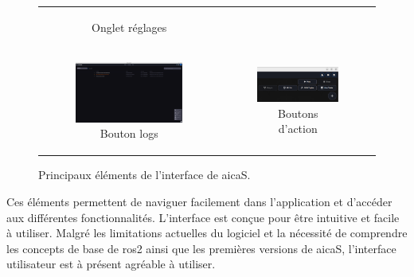 \begin{figure}[H]
\begin{tabular}{cc}
\begin{subfigure}{0.45\textwidth}
            \caption{Onglet réglages}
            \label{fig:aica_rviz}
        \end{subfigure}        \\
        \addlinespace[0.5em]
        \begin{subfigure}{0.45\textwidth}
            \centering
            \includegraphics[width=0.9\linewidth]{assets/figures/AICA_logs.png}
            \caption{Bouton logs}
            \label{fig:aica_logs}
        \end{subfigure}        &
        \begin{subfigure}{0.45\textwidth}
            \centering
            \includegraphics[width=0.9\linewidth]{assets/figures/AICA_play_pause.png}
            \caption{Boutons d'action}
            \label{fig:aica_play_pause}
        \end{subfigure}
    \end{tabular}
    \caption{Principaux éléments de l'interface de \gls{aicaS}.}
    \label{fig:aica_interface_elements}
\end{figure}

Ces éléments permettent de naviguer facilement dans l'application et d'accéder aux différentes fonctionnalités. L'interface est conçue pour être intuitive et facile à utiliser. Malgré les limitations actuelles du logiciel et la nécessité de comprendre les concepts de base de \gls{ros2} ainsi que les premières versions de \gls{aicaS}, l'interface utilisateur est à présent agréable à utiliser.

